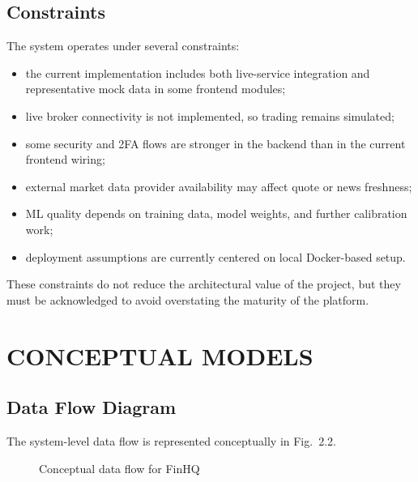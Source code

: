 \documentclass[12pt,a4paper]{report}
\newcommand{\projectshort}{FinHQ}
\begin{document}
\subsection{Constraints}
The system operates under several constraints:
\begin{itemize}
\item the current implementation includes both live-service integration and representative mock data in some frontend modules;
\item live broker connectivity is not implemented, so trading remains simulated;
\item some security and 2FA flows are stronger in the backend than in the current frontend wiring;
\item external market data provider availability may affect quote or news freshness;
\item ML quality depends on training data, model weights, and further calibration work;
\item deployment assumptions are currently centered on local Docker-based setup.
\end{itemize}

These constraints do not reduce the architectural value of the project, but they must be acknowledged to avoid overstating the maturity of the platform.

\section{CONCEPTUAL MODELS}
\subsection{Data Flow Diagram}
The system-level data flow is represented conceptually in Fig.~2.2.

\begin{figure}[H]
\centering
{}
\caption{Conceptual data flow for \projectshort{}}
\end{figure}
\end{document}
